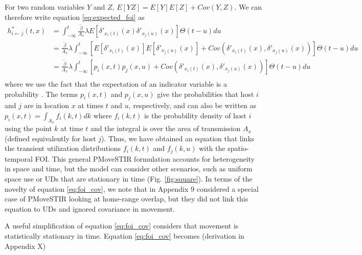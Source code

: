 \documentclass[letterpaper]{article}
\begin{document}
For two random variables $Y$ and $Z$, $E[YZ] = E[Y]E[Z] + Cov(Y, Z)$.  We can therefore write equation \ref{eq:expected_foi} as
\begin{equation}
    \begin{aligned}
        h^*_{i \leftarrow j}(t, x) &= \int_{-\infty}^{t} \frac{\tilde{\beta}}{A_x} \lambda E[\delta'_{x_i(t)}(x) \delta'_{x_j(u)}(x)] \Theta(t - u) du \\
        &= \frac{\tilde{\beta}}{A_x} \lambda \int_{-\infty}^{t} [E[\delta'_{x_i(t)}(x)] E[\delta'_{x_j(u)}(x)] + Cov(\delta'_{x_i(t)}(x), \delta'_{x_j(u)}(x))] \Theta(t - u) du \\
        &= \frac{\tilde{\beta}}{A_x} \lambda \int_{-\infty}^{t} [p_i(x, t) p_j(x, u) + Cov(\delta'_{x_i(t)}(x), \delta'_{x_j(u)}(x))] \Theta(t - u) du \\
    \end{aligned}
    \label{eq:foi_cov}
\end{equation}
where we use the fact that the expectation of an indicator variable is a probability \citep{Grimmett2001}. The terms $p_i(x, t)$ and $p_j(x,u)$ give the probabilities that host $i$ and $j$ are in location $x$ at times $t$ and $u$, respectively, and can also be written as $p_i(x, t) = \int_{A_x} f_i(k, t) dk$ where $f_i(k, t)$ is the probability density of host $i$ using the point $k$ at time $t$ and the integral is over the area of transmission $A_x$ (defined equivalently for host $j$). Thus, we have obtained an equation that links the transient utilization distributions $f_i(k, t)$ and $f_j(k, u)$ with the spatio-temporal FOI.
This general PMoveSTIR formulation accounts for heterogeneity in space and time, but the model can consider other scenarios, such as uniform space use or UDs that are stationary in time (Fig. \ref{fig:square}).  In terms of the novelty of equation \ref{eq:foi_cov}, we note that \cite{Wilber2022} in Appendix 9 considered a special case of PMoveSTIR looking at home-range overlap, but they did not link this equation to UDs and ignored covariance in movement.

A useful simplification of equation \ref{eq:foi_cov} considers that movement is statistically stationary in time. Equation \ref{eq:foi_cov} becomes (derivation in Appendix X)
\end{document}
